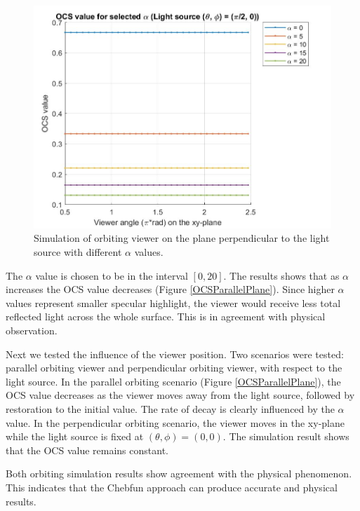 \documentclass[11pt,reqno]{amsart}
\theoremstyle{definition}
\begin{document}
\begin{figure}[h]
\centering \includegraphics[scale=0.4]{./figs/OCS_perpendicular_plane}
\caption{Simulation of orbiting viewer on the plane perpendicular to the light source with different $\alpha$ values.}
\label{OCSPerpendicularPlane}
\end{figure}

The $\alpha$ value is chosen to be in the interval $[0,20]$. The results shows that as $\alpha$ increases the OCS value decreases (Figure \ref{OCSParallelPlane}). Since higher $\alpha$ values represent smaller specular highlight, the viewer would receive less total reflected light across the whole surface. This is in agreement with physical observation.

Next we tested the influence of the viewer position. Two scenarios were tested: parallel orbiting viewer and perpendicular orbiting viewer, with respect to the light source. In the parallel orbiting scenario (Figure \ref{OCSParallelPlane}), the OCS value decreases as the viewer moves away from the light source, followed by restoration to the initial value. The rate of decay is clearly influenced by the $\alpha$ value. In the perpendicular orbiting scenario, the viewer moves in the xy-plane while the light source is fixed at $(\theta, \phi) = (0,0)$. The simulation result shows that the OCS value remains constant.

Both orbiting simulation results show agreement with the physical phenomenon. This indicates that the  Chebfun approach can produce accurate and physical results.
\end{document}
